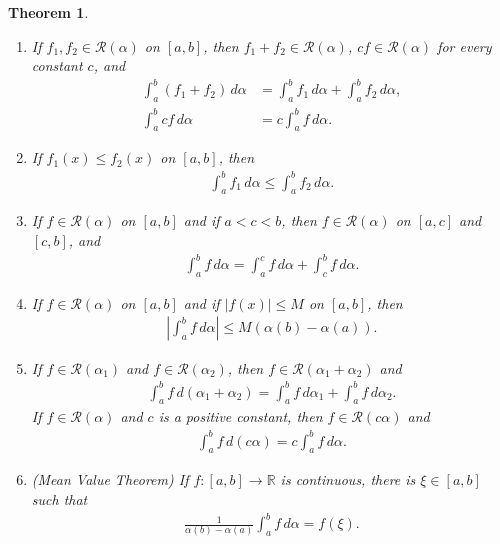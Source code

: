 \documentclass[10pt]{book}
\newtheorem{theorem}{Theorem}[chapter]
\theoremstyle{definition}
\numberwithin{equation}{chapter}
\begin{document}
\begin{theorem}
~\begin{enumerate}[label=(\alph*)]\label{th_59}
    \item If $f_1, f_2 \in \mathscr{R}(\alpha)$ on $[a,b]$, then $f_1 + f_2 \in \mathscr{R}(\alpha)$, $cf \in \mathscr{R}(\alpha)$ for every constant $c$, and
    \begin{align*}
        \int^b_a (f_1 + f_2) \,d\alpha & = \int^b_a f_1 \,d\alpha + \int^b_a f_2 \,d\alpha, \\
        \int^b_a cf \,d\alpha & = c \int^b_a f \,d\alpha.
    \end{align*} \label{th_59_a}
    
    \item If $f_1(x) \leq f_2(x)$ on $[a,b]$, then
    \begin{align*}
        \int^b_a f_1 \,d\alpha \leq \int^b_a f_2 \,d\alpha.
    \end{align*} \label{th_59_b}
    
    \item If $f \in \mathscr{R}(\alpha)$ on $[a,b]$ and if $a < c < b$, then $f \in \mathscr{R}(\alpha)$ on $[a,c]$ and $[c,b]$, and
    \begin{align*}
        \int^b_a f \,d\alpha = \int^c_a f \,d\alpha + \int^b_c f \,d\alpha.
    \end{align*} \label{th_59_c}
    
    \item If $f \in \mathscr{R}(\alpha)$ on $[a,b]$ and if $\left|f(x)\right| \leq M$ on $[a,b]$, then
    \begin{align*}
        \left|\int^b_a f \,d\alpha\right| \leq M \left(\alpha(b) - \alpha(a)\right).
    \end{align*} \label{th_59_d}
    
    \item If $f \in \mathscr{R}(\alpha_1)$ and $f \in \mathscr{R}(\alpha_2)$, then $f \in \mathscr{R}(\alpha_1 + \alpha_2)$ and
    \begin{align*}
        \int^b_a f \,d(\alpha_1 + \alpha_2) = \int^b_a f \,d\alpha_1 + \int^b_a f \,d\alpha_2.
    \end{align*}
    If $f \in \mathscr{R}(\alpha)$ and $c$ is a positive constant, then $f \in \mathscr{R}(c\alpha)$ and 
    \begin{align*}
        \int^b_a f \,d(c\alpha) = c \int^b_a f \,d\alpha.
    \end{align*} \label{th_59_e}
    
    \item (Mean Value Theorem) If $f: [a,b] \to \mathbb{R}$ is continuous, there is $\xi \in [a,b]$ such that
    \begin{align*}
        \frac{1}{\alpha(b) - \alpha(a)} \int^b_a f \,d\alpha = f(\xi).
    \end{align*} \label{th_59_f}
\end{enumerate}
\end{theorem}
\end{document}
